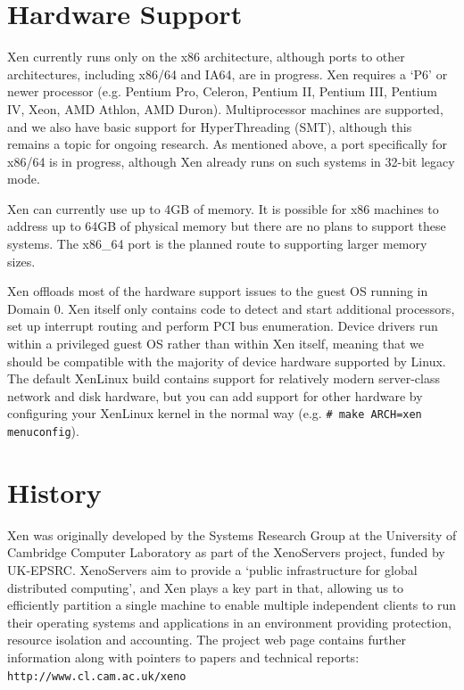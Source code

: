 \documentclass[11pt,twoside,final,openright]{xenstyle}
\begin{document}
\section{Hardware Support}

Xen currently runs only on the x86 architecture, although ports to other
architectures, including x86/64 and IA64, are in progress.
Xen requires a `P6' or newer processor (e.g. Pentium Pro, Celeron,
Pentium II, Pentium III, Pentium IV, Xeon, AMD Athlon, AMD Duron).
Multiprocessor machines are supported, and we also have basic support
for HyperThreading (SMT), although this remains a topic for ongoing
research.  As mentioned above, a port specifically for x86/64 is in
progress, although Xen already runs on such systems in 32-bit legacy
mode.

Xen can currently use up to 4GB of memory.  It is possible for x86
machines to address up to 64GB of physical memory but there are no
plans to support these systems.  The x86\_64 port is the planned route
to supporting larger memory sizes. 

Xen offloads most of the hardware support issues to the guest OS
running in Domain 0.  Xen itself only contains code to detect and
start additional processors, set up interrupt routing and perform PCI
bus enumeration.  Device drivers run within a privileged guest OS
rather than within Xen itself, meaning that we should be
compatible with the majority of device hardware supported by Linux.
The default XenLinux build contains support for relatively modern
server-class network and disk hardware, but you can add support for
other hardware by configuring your XenLinux kernel in the normal way
(e.g. \verb_# make ARCH=xen menuconfig_).

\section{History}


Xen was originally developed by the Systems Research Group at the
University of Cambridge Computer Laboratory as part of the XenoServers
project, funded by UK-EPSRC.
XenoServers aim to provide a `public infrastructure for
global distributed computing', and Xen plays a key part in that,
allowing us to efficiently partition a single machine to enable
multiple independent clients to run their operating systems and
applications in an environment providing protection, resource
isolation and accounting.  The project web page contains further
information along with pointers to papers and technical reports:
{\tt http://www.cl.cam.ac.uk/xeno}
\end{document}
